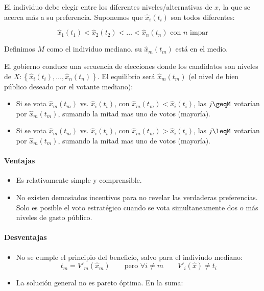 \begin{enumerate}
El individuo debe elegir entre los diferentes niveles/alternativas de $x$, la que se acerca más a su preferencia. Suponemos que $\hat{x}_{i} (t_{i})$ son todos diferentes:

$$\hat{x}_1 (t_{1})< \hat{x}_2 (t_{2})< \ldots < \hat{x}_n (t_{n}) \mbox{ con } n \mbox{ impar} $$

Definimos $M$ como el individuo mediano. su $\hat{x}_{m} (t_{m})$ está en el medio.

El gobierno conduce una secuencia de elecciones donde  los candidatos son niveles de $X:\left\lbrace \hat{x}_{i} (t_{i}), \ldots,\hat{x}_{n} (t_{n}) \right\rbrace $. El equilibrio será $\hat{x}_{m} (t_{m})$ (el nivel de bien público deseado por el votante mediano):

\begin{itemize}
 \item Si se vota $\hat{x}_{m} (t_{m})$ vs. $\hat{x}_{i} (t_{i})$, con $\hat{x}_{m} (t_{m}) < \hat{x}_{i} (t_{i})$, las $j\geqM$ votarían por $\hat{x}_{m} (t_{m})$, sumando la mitad mas uno de votos (mayoría).
 \item Si se vota $\hat{x}_{m} (t_{m})$ vs. $\hat{x}_{i} (t_i)$, con $\hat{x}_m (t_m) > \hat{x}_i (t_i)$, las $j\leqM$ votarían por $\hat{x}_m (t_m)$, sumando la mitad mas uno de votos (mayoría).
\end{itemize}

\paragraph{Ventajas}

\begin{itemize}
 \item Es relativamente simple y comprensible.
 \item No existen demasiados incentivos para no revelar las verdaderas preferencias. Solo es posible el voto estratégico cuando se vota simultaneamente dos o más niveles de gasto público.
\end{itemize}

\paragraph{Desventajas}

\begin{itemize}
 \item No se cumple el principio del beneficio, salvo para el indiviudo mediano:
$$t_{m}= V'_{m} (\hat{x}_{m}) \qquad \mbox{pero   } \forall i \neq m \qquad  V'_{i}(\hat{x})  \neq t_{i} $$
 \item La solución general no es pareto óptima. En la suma:


\end{itemize}
\end{enumerate}
